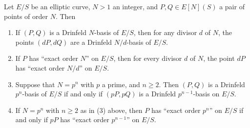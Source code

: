 \begin{kthm}\label{thm:5.5.7}
Let $E/S$ be an elliptic curve, $N > 1$ an integer, and $P, Q \in E[N](S)$ a pair of points of order $N$. Then
\begin{enumerate}[(1)]
\item If $(P, Q)$ is a Drinfeld $N$-basis of $E/S$, then for any divisor $d$ of $N$, the points $(dP, dQ)$ are a Drinfeld $N/d$-basis of $E/S$.
\item If $P$ has ``exact order $N$'' on $E/S$, then for every divisor $d$ of $N$, the point $dP$ has ``exact order $N/d$'' on $E/S$.
\item Suppose that $N = p^n$ with $p$ a prime, and $n \ge 2$. Then $(P, Q)$ is a Drinfeld $p^n$-basis of $E/S$ if and only if $(pP, pQ)$ is a Drinfeld $p^{n-1}$-basis on $E/S$.
\item If $N = p^n$ with $n \ge 2$ as in (3) above, then $P$ has ``exact order $p^n$'' on $E/S$ if and only if $pP$ has ``exact order $p^{n-1}$'' on $E/S$.
\end{enumerate}
\end{kthm}

